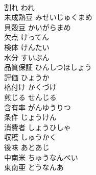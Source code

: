 \documentclass[8pt]{extreport}
\begin{document}
\begin{CJK}{UTF8}{min}
\\	割れ	われ	
\\	未成熟豆	みせいじゅくまめ	
\\	貝殻豆	かいがらまめ	
\\	欠点	けってん	
\\	検体	けんたい	
\\	水分	すいぶん	
\\	品質保証	ひんしつほしょう	
\\	評価	ひょうか	
\\	格付け	かくづけ	
\\	煎じる	せんじる	
\\	含有率	がんゆうりつ	
\\	条件	じょうけん	
\\	消費者	しょうひしゃ	
\\	収穫	しゅうかく	
\\	後味	あとあじ	
\\	中南米	ちゅうなんべい	
\\	東南亜	とうなんあ	
\end{CJK}
\end{document}

